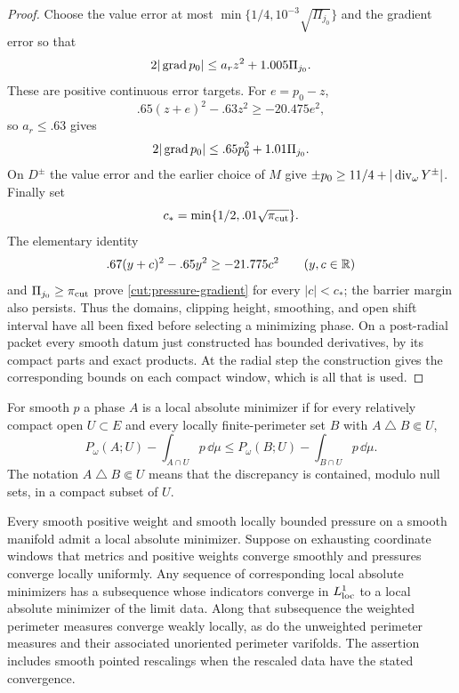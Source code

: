 \begin{proof}
Choose the value error at most
$\min\{1/4,10^{-3}\sqrt{\Pi_{j_0}}\}$ and the gradient error so that
\[
 2|\operatorname{grad} p_0|\le a_rz^2+1.005\Pi_{j_0}.
\]
These are positive continuous error targets.  For $e=p_0-z$,
\[
 .65(z+e)^2-.63z^2\ge-20.475e^2,
\]
so $a_r\le .63$ gives
\[
             2|\operatorname{grad} p_0|\le .65p_0^2+1.01\Pi_{j_0}.
\]
On $D^\pm$ the value error and the earlier choice of $M$ give
$\pm p_0\ge 11/4+|\operatorname{div}_\omega Y^\pm|$.  Finally set
\[
           c_* =\min\{1/2,.01\sqrt{\pi_{\rm cut}}\}.
\]
The elementary identity
\[
 .67(y+c)^2-.65y^2\ge-21.775c^2\qquad(y,c\in\mathbb R)
\]
and $\Pi_{j_0}\ge\pi_{\rm cut}$ prove
\eqref{cut:pressure-gradient} for every $|c|<c_*$; the barrier margin
also persists.  Thus the domains, clipping height, smoothing, and open
shift interval have all been fixed before selecting a minimizing phase.
On a post-radial packet every smooth datum just constructed has bounded
derivatives, by its compact parts and exact products.  At the radial
step the construction gives the corresponding bounds on each compact
window, which is all that is used.
\end{proof}

\begin{definition}\label{cut:minimizer-definition}
For smooth $p$ a phase $A$ is a local absolute minimizer if for every
relatively compact open $U\subset E$ and every locally finite-perimeter
set $B$ with $A\mathbin\triangle B\Subset U$,
\begin{equation}\label{cut:local-minimality}
 P_\omega(A;U)-\int_{A\cap U}p\,\dd\mu
 \le P_\omega(B;U)-\int_{B\cap U}p\,\dd\mu.
\end{equation}
The notation $A\mathbin\triangle B\Subset U$ means that the discrepancy
is contained, modulo null sets, in a compact subset of $U$.
\end{definition}

\begin{lemma}\label{cut:bv-compactness}
Every smooth positive weight and smooth locally bounded pressure on a
smooth manifold admit a local absolute minimizer.  Suppose on exhausting
coordinate windows that metrics and positive weights converge smoothly
and pressures converge locally uniformly.  Any sequence of corresponding
local absolute minimizers has a subsequence whose indicators converge in
$L^1_{\rm loc}$ to a local absolute minimizer of the limit data.  Along
that subsequence the weighted perimeter measures converge weakly locally,
as do the unweighted perimeter measures and their associated unoriented
perimeter varifolds.  The assertion includes smooth pointed rescalings
when the rescaled data have the stated convergence.
\end{lemma}

